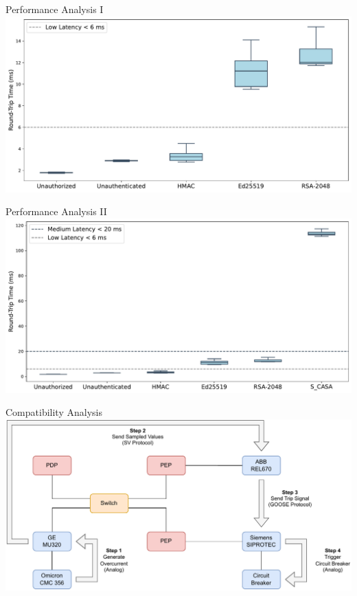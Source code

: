 \documentclass[en]{sdqbeamer}
\begin{document}
\begin{frame}{Performance Analysis I}
    \centering
    \includegraphics[height=0.75\textheight]{./figures/boxplot_without_casa.pdf}
\end{frame}
\begin{frame}{Performance Analysis II}
    \centering
    \includegraphics[height=0.75\textheight]{./figures/boxplot_with_casa.pdf}
\end{frame}
\begin{frame}{Compatibility Analysis}
    \centering
    \includegraphics[height=0.75\textheight]{./figures/lab_evaluation_steps_simplified.drawio.pdf}
\end{frame}
\end{document}
